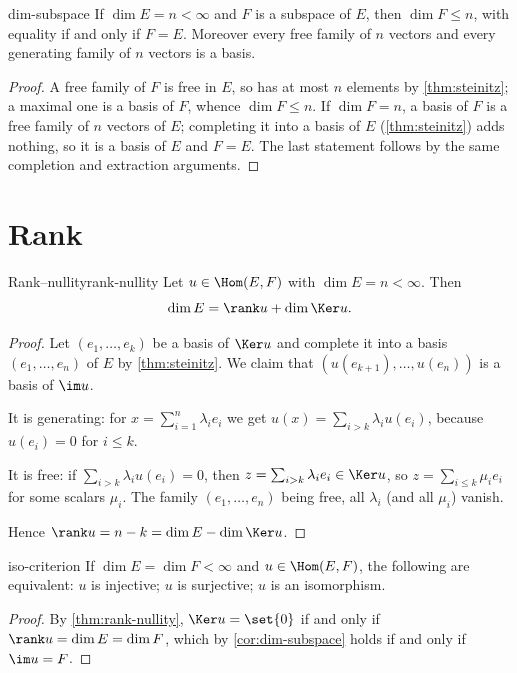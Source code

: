 \begin{corollary}{}{dim-subspace}
If $\dim E=n<\infty$ and $F$ is a subspace of $E$, then $\dim F\leq n$, with
equality if and only if $F=E$. Moreover every free family of $n$ vectors and
every generating family of $n$ vectors is a basis.
\end{corollary}

\begin{proof}
A free family of $F$ is free in $E$, so has at most $n$ elements by
\cref{thm:steinitz}; a maximal one is a basis of $F$, whence $\dim F\leq n$. If
$\dim F=n$, a basis of $F$ is a free family of $n$ vectors of $E$; completing it
into a basis of $E$ (\cref{thm:steinitz}) adds nothing, so it is a basis of $E$
and $F=E$. The last statement follows by the same completion and extraction
arguments.
\end{proof}

\section{Rank}

\begin{theorem}{Rank--nullity}{rank-nullity}
Let $u\in\Hom(E,F)$ with $\dim E=n<\infty$. Then
\[
  \dim E=\rank u+\dim\Ker u .
\]
\end{theorem}

\begin{proof}
Let $(e_1,\dots,e_k)$ be a basis of $\Ker u$ and complete it into a basis
$(e_1,\dots,e_n)$ of $E$ by \cref{thm:steinitz}. We claim that
$(u(e_{k+1}),\dots,u(e_n))$ is a basis of $\im u$.

It is generating: for $x=\sum_{i=1}^{n}\lambda_i e_i$ we get
$u(x)=\sum_{i>k}\lambda_i u(e_i)$, because $u(e_i)=0$ for $i\leq k$.

It is free: if $\sum_{i>k}\lambda_i u(e_i)=0$, then
$z=\sum_{i>k}\lambda_i e_i\in\Ker u$, so $z=\sum_{i\leq k}\mu_i e_i$ for some
scalars $\mu_i$. The family $(e_1,\dots,e_n)$ being free, all $\lambda_i$ (and
all $\mu_i$) vanish.

Hence $\rank u=n-k=\dim E-\dim\Ker u$.
\end{proof}

\begin{corollary}{}{iso-criterion}
If $\dim E=\dim F<\infty$ and $u\in\Hom(E,F)$, the following are equivalent:
$u$ is injective; $u$ is surjective; $u$ is an isomorphism.
\end{corollary}

\begin{proof}
By \cref{thm:rank-nullity}, $\Ker u=\set{0}$ if and only if $\rank u=\dim E=\dim F$,
which by \cref{cor:dim-subspace} holds if and only if $\im u=F$.
\end{proof}

